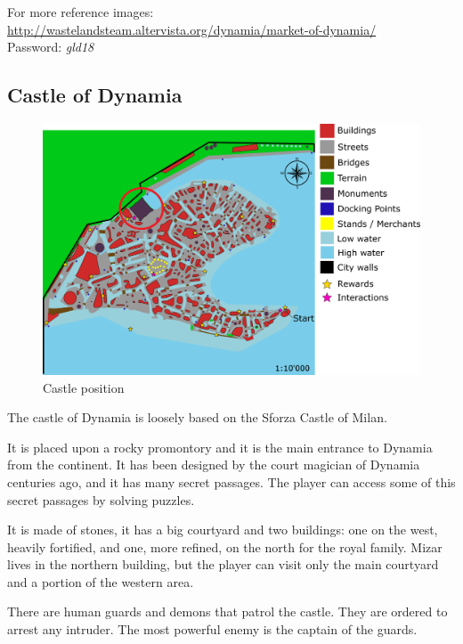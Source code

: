 For more reference images: \url{http://wastelandsteam.altervista.org/dynamia/market-of-dynamia/}\\
Password: \textit{gld18}

\subsection{Castle of Dynamia}
\begin{figure}[H]
  \centering
  \includegraphics[width=\textwidth]{Images/Maps/dynamia_castleOfDynamia}
  \caption{Castle position}
\end{figure}

The castle of Dynamia is loosely based on the Sforza Castle of Milan.

It is placed upon a rocky promontory and it is the main entrance to Dynamia from the continent. It has been designed by the court magician of Dynamia centuries ago, and it has many secret passages. The player can access some of this secret passages by solving puzzles.

It is made of stones, it has a big courtyard and two buildings: one on the west, heavily fortified, and one, more refined, on the north for the royal family. Mizar lives in the northern building, but the player can visit only the main courtyard and a portion of the western area.

There are human guards and demons that patrol the castle. They are ordered to arrest any intruder. The most powerful enemy is the captain of the guards.

